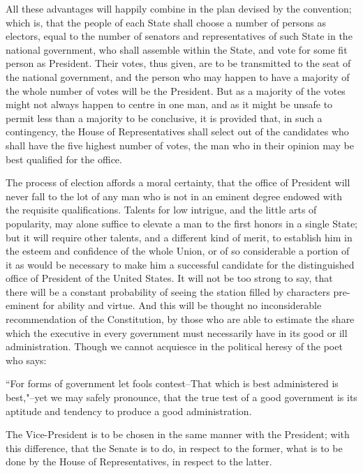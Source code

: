 All these advantages will happily combine in the plan devised by the convention; which is, that the people of each State shall choose a number of persons as electors, equal to the number of senators and representatives of such State in the national government, who shall assemble within the State, and vote for some fit person as President. 
Their votes, thus given, are to be transmitted to the seat of the national government, and the person who may happen to have a majority of the whole number of votes will be the President. 
But as a majority of the votes might not always happen to centre in one man, and as it might be unsafe to permit less than a majority to be conclusive, it is provided that, in such a contingency, the House of Representatives shall select out of the candidates who shall have the five highest number of votes, the man who in their opinion may be best qualified for the office.

The process of election affords a moral certainty, that the office of President will never fall to the lot of any man who is not in an eminent degree endowed with the requisite qualifications. 
Talents for low intrigue, and the little arts of popularity, may alone suffice to elevate a man to the first honors in a single State; but it will require other talents, and a different kind of merit, to establish him in the esteem and confidence of the whole Union, or of so considerable a portion of it as would be necessary to make him a successful candidate for the distinguished office of President of the United States. 
It will not be too strong to say, that there will be a constant probability of seeing the station filled by characters pre-eminent for ability and virtue. 
And this will be thought no inconsiderable recommendation of the Constitution, by those who are able to estimate the share which the executive in every government must necessarily have in its good or ill administration. 
Though we cannot acquiesce in the political heresy of the poet who says:

``For forms of government let fools contest--That which is best administered is best,"--yet we may safely pronounce, that the true test of a good government is its aptitude and tendency to produce a good administration.

The Vice-President is to be chosen in the same manner with the President; with this difference, that the Senate is to do, in respect to the former, what is to be done by the House of Representatives, in respect to the latter.

